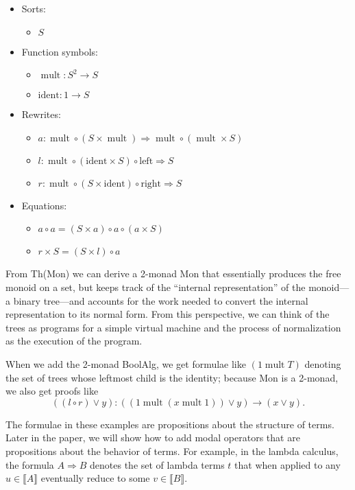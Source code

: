 \documentclass{article}
\newcommand{\interp}[1]{\llbracket #1 \rrbracket}
\newcommand{\maps}{\colon}
\renewcommand{\left}{\mathrm{left}}
\renewcommand{\right}{\mathrm{right}}
\newcommand{\mult}{\mathop{\mathrm{mult}}}
\newcommand{\ident}{\mathrm{ident}}
\begin{document}
\begin{center}
  \begin{itemize}
    \item Sorts:
    \begin{itemize}
      \item $S$
    \end{itemize}
    \item Function symbols:
    \begin{itemize}
      \item $\mult\maps S^2 \to S$
      \item $\ident\maps 1 \to S$
    \end{itemize}
    \item Rewrites:
    \begin{itemize}
      \item $a\maps \mult \circ (S \times \mult) \Rightarrow \mult \circ (\mult \times S)$
      \item $l\maps \mult \circ (\ident \times S) \circ \left \Rightarrow S$
      \item $r\maps \mult \circ (S \times \ident) \circ \right \Rightarrow S$
    \end{itemize}
    \item Equations:
    \begin{itemize}
      \item $a \circ a = (S \times a) \circ a \circ (a \times S)$
      \item $r \times S = (S \times l) \circ a$
    \end{itemize}
  \end{itemize}
\end{center}
From Th(Mon) we can derive a 2-monad Mon that essentially produces the free monoid on a set, but keeps track of the ``internal representation'' of the monoid---a binary tree---and accounts for the work needed to convert the internal representation to its normal form.  From this perspective, we can think of the trees as programs for a simple virtual machine and the process of normalization as the execution of the program.

When we add the 2-monad BoolAlg, we get formulae like $(1 \mult T)$ denoting the set of trees whose leftmost child is the identity; because Mon is a 2-monad, we also get proofs like 
\[ ((l \circ r) \lor y)\maps ((1 \mult (x \mult 1)) \lor y) \to (x \lor y). \]

The formulae in these examples are propositions about the structure of terms.  Later in the paper, we will show how to add modal operators that are propositions about the behavior of terms.  For example, in the lambda calculus, the formula ${A \Rightarrow B}$ denotes the set of lambda terms $t$ that when applied to any $u \in \interp{A}$ eventually reduce to some $v \in \interp{B}.$
\end{document}
